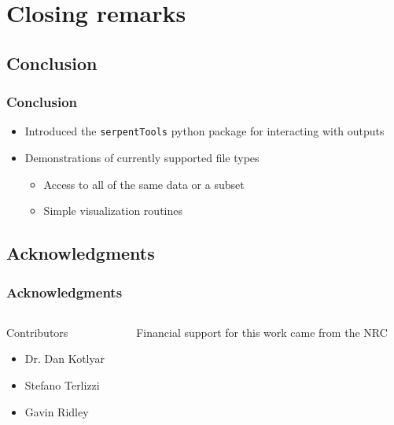 \section{Closing remarks}
\subsection{Conclusion}
\begin{frame}
    \frametitle{Conclusion}
    \begin{itemize}
        \item Introduced the \texttt{serpentTools} python package for interacting with \sss outputs
        \item Demonstrations of currently supported file types
            \begin{itemize}
                \item Access to all of the same data or a subset
                \item Simple visualization routines
            \end{itemize}
    \end{itemize}
\end{frame}
\subsection{Acknowledgments}
\begin{frame}
    \frametitle{Acknowledgments}
    \begin{columns}[T]
        \begin{column}{\colShare}
            Contributors
            \begin{itemize}
                    \item Dr. Dan Kotlyar
                    \item Stefano Terlizzi
                    \item Gavin Ridley\footnotemark[1]
            \end{itemize}
        \end{column}
        \begin{column}{\colShare}
            Financial support for this work came from the NRC 
        \end{column}
    \end{columns}
\end{frame}

